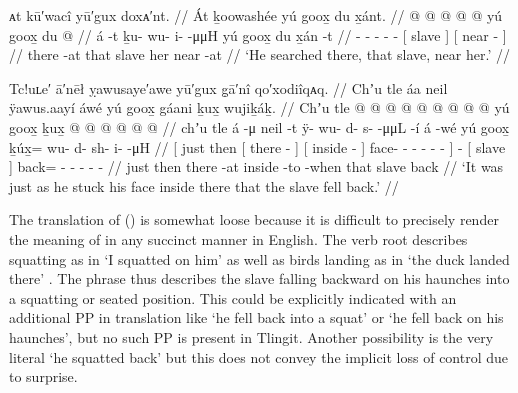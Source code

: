 \ex\label{ex:89-177-searched-there-near}%
%
\begingl
	\glpreamble	ᴀt kū′wacî yū′gux doxᴀ′nt. //
	\glpreamble	Át ḵoowashée yú goox̱ du x̱ánt. //
	\gla	{}  @ {} {}
		 @ {} @ {} @ {} @ {}
		{} yú goox̱ {}
		{} du  @ {} {} //
	\glb	{} á -t {}
		ḵu- wu- i-  -μμH
		{} yú goox̱ {}
		{} du x̱án -t {} //
	\glc	{}  - {}
		- - -  -
		{}[  slave {}]
		{}[  near - {}]  //
	\gld	{} there -at {}
		 {} {} {} {}
		{} that slave {}
		{} her near -at {} //
	\glft	‘He searched there, that slave, near her.’
		//
\endgl
\xe

\clearpage
\ex\label{ex:89-178-face-in-squat-back}%
%
\begingl
	\glpreamble	Tc!uʟe′ ā′nēł ỵawusaye′awe yū′gux g̣ā′nî qo′xodiîqᴀq. //
	\glpreamble	Chʼu tle áa neil ÿawus.aayí áwé yú goox̱ gáani ḵux̱ wujiḵáḵ. //
	\gla	{} Chʼu tle 
			{}  @ {} {}
			{}  @ {} {}
			 @ {} @ {} @ {} @ {} @ {} @ {} {} 
		 @ {}
		{} yú goox̱ {}
		ḵux̱ @  @ {} @ {} @ {} @ {} @ {} //
	\glb	{} chʼu tle
			{} á -μ {}
			{} neil -t {}
			ÿ- wu- d- s-  -μμL -í {}
		á -wé
		{} yú goox̱ {}
		ḵúx̱= wu- d- sh- i-  -μH //
	\glc	{}[ just then
			{}[ there - {}]
			{}[ inside - {}]
			face- - - -  - - {}]
		 -
		{}[  slave {}]
		back= - - - -  - //
	\gld	{} just then
			{} there -at {}
			{} inside -to {}
			 {} {} {} {} {} -when {}
		 {}
		{} that slave {}
		back\•  {} {} {} {} {} //
	\glft	‘It was just as he stuck his face inside there that the slave fell back.’
		//
\endgl
\xe

The translation of (\lastx) is somewhat loose because it is difficult to precisely render the meaning of  in any succinct manner in English.
The verb root  describes squatting as in  ‘I squatted on him’ \parencite[193.2678]{story-naish:1973} as well as birds landing as in  ‘the duck landed there’ \parencite[121.1595]{story-naish:1973}.
The phrase  thus describes the slave falling backward on his haunches into a squatting or seated position.
This could be explicitly indicated with an additional PP in translation like ‘he fell back into a squat’ or ‘he fell back on his haunches’, but no such PP is present in Tlingit.
Another possibility is the very literal ‘he squatted back’ but this does not convey the implicit loss of control due to surprise.

